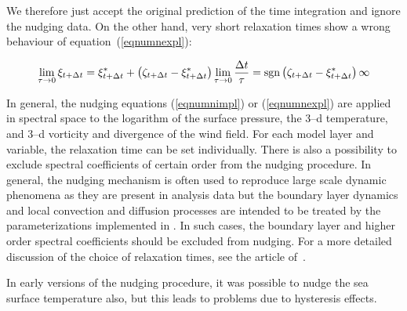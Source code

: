 We therefore just accept the original prediction of the time
integration and ignore the nudging data. On the other hand, very short
relaxation times show a wrong behaviour of
equation~(\ref{eqnumnexpl}):

\begin{equation}\label{eqlimittau0expl}
\lim\limits_{\tau\rightarrow 0}\xi_{t+\Delta t}=\xi^\ast_{t+\Delta
  t}+\left(\zeta_{t+\Delta t}-\xi^\ast_{t+\Delta
t}\right)\lim\limits_{\tau\rightarrow 0}\frac{\Delta
t}{\tau}={\rm sgn}\left(\zeta_{t+\Delta t}-\xi^\ast_{t+\Delta t}\right)\infty
\end{equation}

In general, the nudging equations (\ref{eqnumnimpl}) or
(\ref{eqnumnexpl}) are applied in spectral space to the logarithm of
the surface pressure, the 3--d temperature, and 3--d vorticity and
divergence of the wind field. For each model layer and variable, the
relaxation time can be set individually. There is also a possibility
to exclude spectral coefficients of certain order from the nudging
procedure. In general, the nudging mechanism is often used to reproduce
large scale dynamic phenomena as they are present in analysis data but
the boundary layer dynamics and 
local convection and diffusion processes are intended to be treated by
the parameterizations implemented in \echam. In such cases, the boundary
layer and higher order spectral coefficients should be excluded from
nudging. For a more detailed discussion of the choice of relaxation
times, see the article of~\cite{jeu969}.

In early versions of the nudging procedure, it was possible to nudge
the sea surface temperature also, but this leads to problems due to
hysteresis effects.
